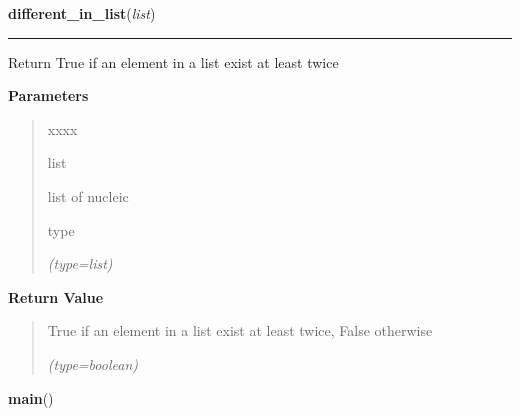     \label{script-VCFilter:different_in_list}

    \vspace{0.5ex}

\hspace{.8\funcindent}\begin{boxedminipage}{\funcwidth}

    \raggedright \textbf{different\_in\_list}(\textit{list})

    \vspace{-1.5ex}

    \rule{\textwidth}{0.5\fboxrule}
\setlength{\parskip}{2ex}
    Return True if an element in a list exist at least twice

\setlength{\parskip}{1ex}
      \textbf{Parameters}
      \vspace{-1ex}

      \begin{quote}
        \begin{Ventry}{xxxx}

          \item[list]

          list of nucleic

          \item[type]

            {\it (type=list)}

        \end{Ventry}

      \end{quote}

      \textbf{Return Value}
    \vspace{-1ex}

      \begin{quote}
      True if an element in a list exist at least twice, False otherwise

      {\it (type=boolean)}

      \end{quote}

    \end{boxedminipage}

    \label{script-VCFilter:main}

    \vspace{0.5ex}

\hspace{.8\funcindent}\begin{boxedminipage}{\funcwidth}

    \raggedright \textbf{main}()

\setlength{\parskip}{2ex}
\setlength{\parskip}{1ex}
    \end{boxedminipage}


